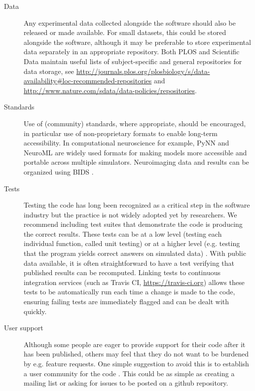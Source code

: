 \documentclass[11pt]{article}
\begin{document}
\begin{description}
\item [Data] Any experimental data collected alongside the software
  should also be released or made available.  For small datasets, this
  could be stored alongside the software, although it may be
  preferable to store experimental data separately in an appropriate
  repository.  Both PLOS and Scientific Data maintain useful lists of
  subject-specific and general repositories for data storage, see
  \url{http://journals.plos.org/plosbiology/s/data-availability#loc-recommended-repositories}
  and \url{http://www.nature.com/sdata/data-policies/repositories}.
  

  
\item [Standards] Use of (community) standards, where appropriate, should
  be encouraged, in particular use of non-proprietary formats
  to enable long-term accessibility.
  In computational neuroscience for example, PyNN
  \cite{Davison2009} and NeuroML \cite{CannonEtAl2014} are widely used
  formats for making models more accessible and portable across
  multiple simulators.  Neuroimaging data and results can be organized
  using BIDS \cite{Gorgolewski2016}.


\item [Tests] Testing the code has long been recognized
  as a critical step in the software industry but the practice is not
  widely adopted yet by researchers. We recommend including test
  suites that demonstrate the code is producing the correct
  results\cite{Axelrod2014-xi}. These tests can be at a low level
  (testing each individual function, called unit testing) or at a
  higher level (e.g. testing that the program yields correct answers
  on simulated data) \cite{wilson_best_2014}. With public data available,
  it is often straightforward to have a test verifying that published
  results can be recomputed. Linking tests to continuous 
  integration services (such as Travis CI, \url{https://travis-ci.org}) allows 
  these tests to be automatically run each time a change is made to the code,
  ensuring failing tests are immediately flagged and can be dealt with quickly.

\item [User support] Although some people are eager to provide support
  for their code after it has been published, others may feel that
  they do not want to be burdened by e.g. feature requests.  One
  simple suggestion to avoid this is to establish a user community for
  the code \cite{Gorgolewski2016b}.  This could be as simple as
  creating a mailing list or asking for issues to be posted on a
  github repository.

\end{description}
\end{document}
